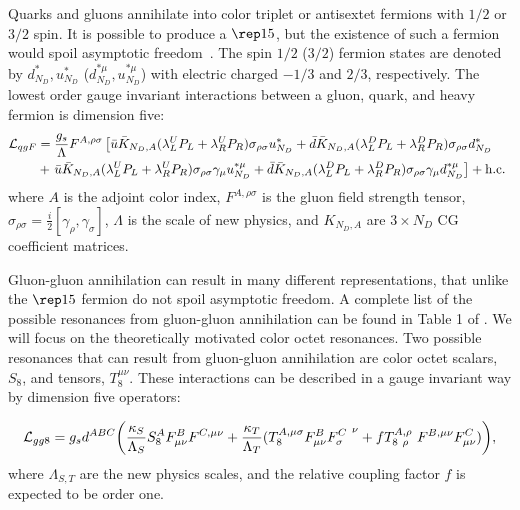 Quarks and gluons annihilate into color triplet or antisextet fermions with $1/2$ or $3/2$ spin.  It is possible to produce a $\rep15$, but the existence of such a fermion would spoil asymptotic freedom~\cite{Chivukula:1990di}.  The spin $1/2$ ($3/2$) fermion states are denoted by $d^*_{N_D},u^*_{N_D}$ ($d^{*\mu}_{N_D},u^{*\mu}_{N_D}$) with electric charged $-1/3$ and $2/3$, respectively. The lowest order gauge invariant interactions between a gluon, quark, and heavy fermion is dimension five:  
\begin{eqnarray}
\displaystyle\mathcal{L}_{qgF} &=  \displaystyle\frac{g_{s}}{\Lambda}F^{A,\rho\sigma}
 \left[\bar u {\bar{K}_{N_D,A}} (\lambda^U_LP_L+\lambda^U_RP_R) \sigma_{\rho\sigma} u_{N_D}^{*} + \bar d {\bar{K}_{N_D,A}} (\lambda^D_LP_L+\lambda^D_RP_R) \sigma_{\rho\sigma} d_{N_D}^{*} ~~~~\right. \\
&  + \left.\bar u {\bar{K}_{N_D,A}} (\lambda^U_LP_L+\lambda^U_RP_R) \sigma_{\rho\sigma} \gamma_{\mu} u_{N_D}^{*\mu}  + \bar d {\bar{K}_{N_D,A}} (\lambda^D_LP_L+\lambda^D_RP_R) \sigma_{\rho\sigma} \gamma_{\mu} d_{N_D}^{*\mu} \right ] + \rm{h.c.}\nonumber
\label{eq:qstar}
\end{eqnarray}
where $A$ is the adjoint color index, $F^{A,\rho\sigma}$ is the gluon field strength tensor, $\sigma_{\rho\sigma}=\frac{i}{2}[\gamma_\rho,\gamma_\sigma]$, $\Lambda$ is the scale of new physics, and $K_{N_D,A}$ are $3\times N_D$ CG coefficient matrices.  

Gluon-gluon annihilation can result in many different representations, that unlike the $\rep15$ fermion do not spoil asymptotic freedom.  A complete list of the possible resonances from gluon-gluon annihilation can be found in Table 1 of .  We will focus on the theoretically motivated color octet resonances.  Two possible resonances that can result from gluon-gluon annihilation are color octet scalars, $S_8$, and tensors, $T_8^{\mu\nu}$.  These interactions can be described in a gauge invariant way by dimension five operators:

\begin{eqnarray}
\mathcal{L}_{gg8}=g_sd^{ABC}\bigg{(}\frac{\kappa_S}{\Lambda_S} S_{8}^{A} F^B_{\mu\nu}F^{C,\mu\nu}+\frac{\kappa_{T}}{\Lambda_T}({T^{A,\mu\sigma}_8}F^{B}_{\mu\nu}{F^{C}_{\sigma}}^{~\nu}+
f {T_{8\ \rho}^{A,\rho}} \
F^{B,\mu\nu}F^C_{\mu\nu})\bigg{)},
\label{eq:tensscal}
\end{eqnarray}
where $\Lambda_{S,T}$ are the new physics scales, and the relative coupling factor $f$ is expected to be order one.  

